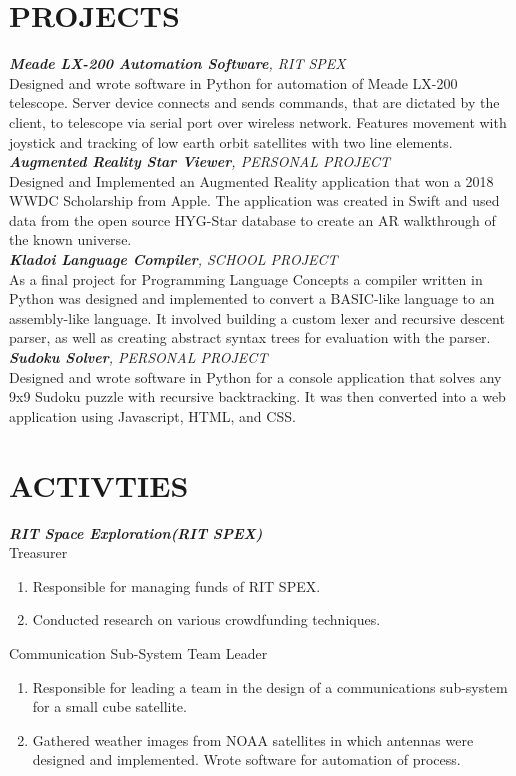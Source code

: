\documentclass[line, margin]{res}
\begin{document}
\begin{resume}
\section{PROJECTS}
\textit{\textbf{Meade LX-200 Automation Software}, RIT SPEX}\\
Designed and wrote software in Python for automation of Meade LX-200 telescope. Server device connects and sends commands, that are dictated by the client, to telescope via serial port over wireless network. Features movement with joystick and tracking of low earth orbit satellites with two line elements.
\\ [10pt]
\textit{\textbf{Augmented Reality Star Viewer}, PERSONAL PROJECT}\\
Designed and Implemented an Augmented Reality application that won a 2018 WWDC Scholarship from Apple.  The application was created in Swift and used data from the open source HYG-Star database to create an AR walkthrough of the known universe.
\\ [10pt]
\textit{\textbf{Kladoi Language Compiler}, SCHOOL PROJECT}\\
As a final project for Programming Language Concepts a compiler written in Python was designed and implemented to convert a BASIC-like language to an assembly-like language.  It involved building a custom lexer and recursive descent parser, as well as creating abstract syntax trees for evaluation with the parser.
\\ [10pt]
\textit{\textbf{Sudoku Solver}, PERSONAL PROJECT}\\
Designed and wrote software in Python for a console application that solves any 9x9 Sudoku puzzle with recursive backtracking.  It was then converted into a web application using Javascript, HTML, and CSS.


\section{ACTIVTIES}
\textit{\textbf{RIT Space Exploration(RIT SPEX)}}\\
Treasurer
      \begin{enumerate}[series=MyList, label=\textbullet]
        \item Responsible for managing funds of RIT SPEX.
        \item Conducted research on various crowdfunding techniques.
      \end{enumerate}
      
Communication Sub-System Team Leader
      \begin{enumerate}[series=MyList, label=\textbullet]
        \item Responsible for leading a team in the design of a communications sub-system for a small cube satellite.
        \item Gathered weather images from NOAA satellites in which antennas were designed and implemented. Wrote software for automation of process.
      \end{enumerate}
      


\end{resume}
\end{document}
